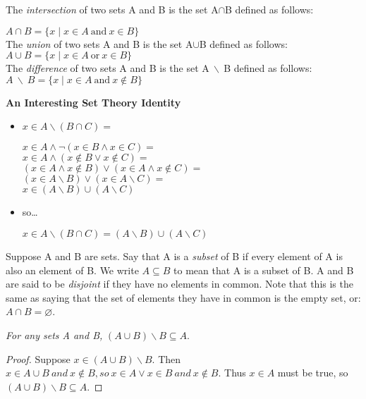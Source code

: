 \documentclass[11pt]{article}
\begin{document}
\begin{definition}{}{}
The \textit{intersection} of two sets A and B is the set A$\cap$B defined as follows: 
    \begin{center}
    $A\cap B = \{x \mid x \in A \ \text{and} \ x \in B\}$ \\
    The \textit{union} of two sets A and B is the set A$\cup$B defined as follows:\\
    $A\cup B = \{x \mid x \in A \ \text{or} \ x \in B\}$ \\
    The \textit{difference} of two sets A and B is the set A$\ \backslash \ $B defined as follows: \\
    $A\  \backslash\ B = \{x \mid x \in A \ \text{and} \ x \notin B\}$ \\
    \end{center}

\end{definition}
\textbf{An Interesting Set Theory Identity}
\begin{itemize}
    \item \textbf{$x \in A \backslash (B \cap C) = $}
    \begin{center}
        $x \in A \wedge \neg (x \in B \wedge x \in C) = $\\
        $x \in A \wedge (x \notin B \vee x \notin C) = $\\
        $(x \in A \wedge x \notin B) \vee (x \in A \wedge x \notin C) = $ \\
        $(x \in A \backslash B) \vee (x \in A \backslash C) = $ \\
        $x \in (A \backslash B) \cup (A \backslash C)$ \\
    \end{center}
    \item so\dots
    \begin{center}
        $x \in A \backslash (B \cap C) = (A \backslash B) \cup (A \backslash C)$
    \end{center}
\end{itemize}
\begin{definition}{}{}
    Suppose A and B are sets. Say that A is a \textit{subset} of B if every element of A is also an element of B. We write $A \subseteq B$ to mean that A is a subset of B. 
    A and B are said to be \textit{disjoint} if they have no elements in common. Note that this is the same as saying that the set of elements they have in common is the empty set, or:
    $A \cap B = \varnothing$.
\end{definition}
\newpage
\begin{theorem}{}{}
    \textit{For any sets A and B,} $(A \cup B) \backslash B \subseteq A.$
\end{theorem}
\begin{proof}
    Suppose $x \in (A \cup B) \backslash B$. Then $x \in A \cup B \ and \ x \notin B,so \ x \in A \vee x \in B \ and \ x \notin B.$ 
    Thus $x \in A$ must be true, so $(A \cup B) \backslash B \subseteq A$.
\end{proof}
\end{document}
